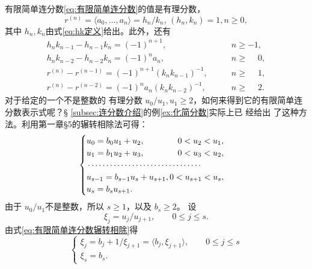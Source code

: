 \begin{theorem}
	有限简单连分数\eqref{eq:有限简单连分数}的值是有理分数，
	\begin{equation}
		r^{(n)} = \langle a_0, \dots, a_n \rangle = h_n/k_n,\, \left(h_n, k_n\right) = 1, n \geqslant 0,
	\end{equation}
	其中 \( h_n, k_n \)由式\eqref{eq:hk定义}给出。此外，还有
	\begin{align}
		h_nk_{n-1} - h_{n-1}k_n = (-1)^{n+1}, \qquad               & n \geqslant -1,           \\
		h_nk_{n-2} - h_{n-2}k_n = (-1)^{n}a_n, \qquad              & n \geqslant \phantom{-}0, \\
		r^{(n)} - r^{(n-1)} = (-1)^{n+1}(k_nk_{n-1})^{-1}, \qquad  & n \geqslant \phantom{-}1, \\
		r^{(n)} - r^{(n-2)} = (-1)^{n}a_n(k_nk_{n-2})^{-1}, \qquad & n \geqslant \phantom{-}2.
	\end{align}
	对于给定的一个不是整数的 有理分数 \( u_0 / u_1, u_1 \geqslant 2 \)，如何来得到它的有限简单连分数表示式呢？\S
	\ref{subsec:连分数介绍}的例\ref{ex:化简分数}实际上已 经给出 了这种方法。利用第一章§5的辗转相除法可得：
	\begin{equation}\label{eq:有限简单连分数辗转相除}
		\begin{cases}
			u_0 = b_0 u_1 + u_2, \hfill              0 < u_2 < u_1,     \\
			u_1 = b_1 u_2 + u_3, \hfill              0 < u_3 < u_2,     \\
			\begin{minipage}{0.4\textwidth}
				\dotfill
			\end{minipage}                              \\
			u_{s-1} = b_{s-1} u_s + u_{s+1}, \hfill  0 < u_{s+1} < u_s, \\
			u_s = b_s u_{s+1}. \hfill
		\end{cases}
	\end{equation}
	由于 \( u_0 / u_1 \)不是整数，所以 \( s \geqslant 1 \)，以及 \( b_s \geqslant 2 \)。 设
	\begin{equation}
		\xi_j = u_j / u_{j+1}, \qquad 0 \leqslant j \leqslant s.
	\end{equation}
	由式\eqref{eq:有限简单连分数辗转相除}得
	\begin{equation}
		\begin{cases}
			\xi_j = b_j + 1 / \xi_{j + 1} = \langle b_j, \xi_{j+1} \rangle, \qquad 0 \leqslant j \leqslant s \\
			\xi_s = b_s.
		\end{cases}

\end{equation}
\end{theorem}
